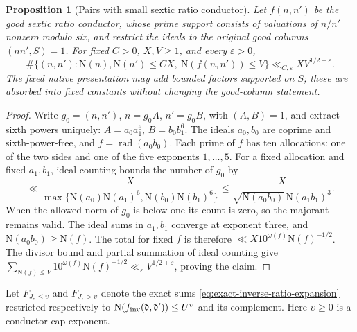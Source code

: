 \documentclass[11pt]{article}
\newtheorem{proposition}[theorem]{Proposition}
\theoremstyle{definition}
\newcommand{\N}{\mathrm N}
\newcommand{\eps}{\varepsilon}
\DeclareMathOperator{\rad}{rad}
\begin{document}
\begin{proposition}[Pairs with small sextic ratio conductor]
\label{prop:ideal-pair-count-direct}
Let \(f(n,n')\) be the good sextic ratio conductor, whose prime support
consists of valuations of \(n/n'\) nonzero modulo six, and restrict the
ideals to the original good columns \((nn',S)=1\).  For fixed
\(C>0\), \(X,V\ge1\), and every \(\eps>0\),
\begin{equation}
 \#\{(n,n'): \N(n),\N(n')\le CX,\ \N(f(n,n'))\le V\}
        \ll_{C,\eps} XV^{1/2+\eps}.
 \label{eq:elementary-ideal-pair-count}
\end{equation}
The fixed native presentation may add bounded factors supported on
\(S\); these are absorbed into fixed constants without changing the
good-column statement.
\end{proposition}
\begin{proof}
Write \(g_0=(n,n')\), \(n=g_0A\), \(n'=g_0B\), with
\((A,B)=1\), and extract sixth powers uniquely:
\(A=a_0a_1^6\), \(B=b_0b_1^6\).  The ideals \(a_0,b_0\) are
coprime and sixth-power-free, and
\(f=\rad(a_0b_0)\).  Each prime of \(f\) has ten allocations:
one of the two sides and one of the five exponents \(1,\ldots,5\).
For a fixed allocation and fixed \(a_1,b_1\), ideal counting bounds
the number of \(g_0\) by
\[
 \ll \frac{X}{\max\{\N(a_0)\N(a_1)^6,
                           \N(b_0)\N(b_1)^6\}}
 \le\frac{X}{\sqrt{\N(a_0b_0)}\,\N(a_1b_1)^3}.
\]
When the allowed norm of \(g_0\) is below one its count is zero, so
the majorant remains valid.  The ideal sums in \(a_1,b_1\) converge
at exponent three, and \(\N(a_0b_0)\ge\N(f)\).  The total for
fixed \(f\) is therefore
\(\ll X10^{\omega(f)}\N(f)^{-1/2}\).  The divisor bound and partial
summation of ideal counting give
\(\sum_{\N(f)\le V}10^{\omega(f)}\N(f)^{-1/2}
\ll_\eps V^{1/2+\eps}\), proving the claim.
\end{proof}

Let \(F_{J,\le\upsilon}\) and \(F_{J,>\upsilon}\) denote the exact sums
\eqref{eq:exact-inverse-ratio-expansion} restricted respectively to
\(\N(f_{\rm inv}(\mathfrak d,\mathfrak d'))\le U^\upsilon\) and
its complement.  Here \(\upsilon\ge0\) is a conductor-cap exponent.
\end{document}
